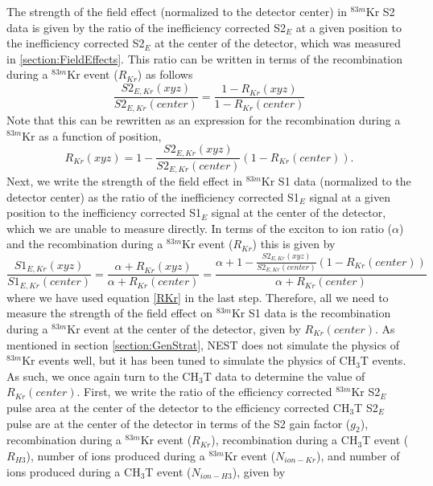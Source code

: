 \documentclass[a4paper,12pt]{article}
\begin{document}
{%
The strength of the field effect (normalized to the detector center) in $^{83m}$Kr S2 data is given by the ratio of the inefficiency corrected S2$_E$ at a given position to the inefficiency corrected S2$_E$ at the center of the detector, which was measured in \ref{section:FieldEffects}.  This ratio can be written in terms of the recombination during a $^{83m}$Kr event ($R_{Kr}$) as follows
\begin{equation}
\frac{S2_{E,Kr}(xyz)}{S2_{E,Kr}(center)} = \frac{1-R_{Kr}(xyz)}{1-R_{Kr}(center)}
\end{equation}
Note that this can be rewritten as an expression for the recombination during a $^{83m}$Kr as a function of position,
\begin{equation} \label{RKr}
R_{Kr}(xyz) = 1- \frac{S2_{E,Kr}(xyz)}{S2_{E,Kr}(center)}(1-R_{Kr}(center)).
\end{equation}
Next, we write the strength of the field effect in $^{83m}$Kr S1 data (normalized to the detector center) as the ratio of the inefficiency corrected S1$_E$ signal at a given position to the inefficiency corrected S1$_E$ signal at the center of the detector, which we are unable to measure directly.  In terms of the exciton to ion ratio ($\alpha$) and the recombination during a $^{83m}$Kr event ($R_{Kr}$) this is given by 
\begin{equation} \label{S1fieldstrength}
\frac{S1_{E,Kr}(xyz)}{S1_{E,Kr}(center)}=\frac{\alpha+R_{Kr}(xyz)}{\alpha+R_{Kr}(center)} = \frac{\alpha + 1 - \frac{S2_{E,Kr}(xyz)}{S2_{E,Kr}(center)}(1-R_{Kr}(center))}{\alpha + R_{Kr}(center)}
\end{equation}
where we have used equation \ref{RKr} in the last step.  Therefore, all we need to measure the strength of the field effect on $^{83m}$Kr S1 data is the recombination during a $^{83m}$Kr event at the center of the detector, given by $R_{Kr}(center)$.  As mentioned in section \ref{section:GenStrat}, NEST does not simulate the physics of $^{83m}$Kr events well, but it has been tuned to simulate the physics of CH$_3$T events.  As such, we once again turn to the CH$_3$T data to determine the value of $R_{Kr}(center)$.  First, we write the ratio of the efficiency corrected $^{83m}$Kr  S2$_E$ pulse area at the center of the detector to the efficiency corrected CH$_3$T S2$_E$ pulse are at the center of the detector in terms of the S2 gain factor ($g_2$), recombination during a $^{83m}$Kr event ($R_{Kr}$), recombination during a CH$_3$T event ($R_{H3}$), number of ions produced during a $^{83m}$Kr event ($N_{ion-Kr}$), and number of ions produced during a CH$_3$T event ($N_{ion-H3}$), given by
}
\end{document}
